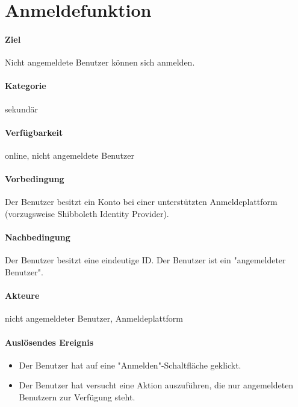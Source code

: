 \section{Anmeldefunktion}
\label{Anmeldefunktion}
\paragraph{Ziel}
Nicht angemeldete Benutzer können sich anmelden.
\paragraph{Kategorie}
sekundär
\paragraph{Verfügbarkeit}
online, nicht angemeldete Benutzer
\paragraph{Vorbedingung}
Der Benutzer besitzt ein Konto bei einer unterstützten Anmeldeplattform (vorzugsweise Shibboleth Identity Provider).
\paragraph{Nachbedingung}
Der Benutzer besitzt eine eindeutige ID. Der Benutzer ist ein "angemeldeter Benutzer".
\paragraph{Akteure}
nicht angemeldeter Benutzer, Anmeldeplattform
\paragraph{Auslösendes Ereignis}
\begin{itemize}
      \item Der Benutzer hat auf eine "Anmelden"-Schaltfläche geklickt.
      \item Der Benutzer hat versucht eine Aktion auszuführen, die nur angemeldeten Benutzern zur Verfügung steht.
\end{itemize}
